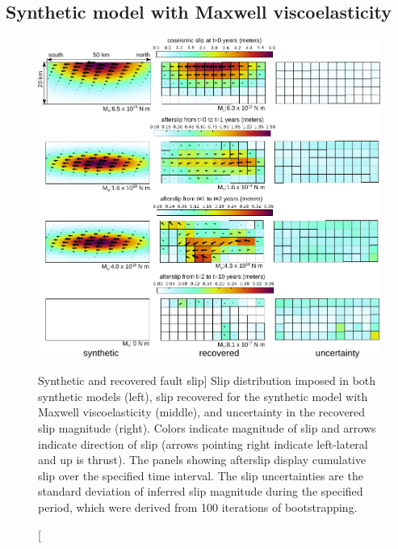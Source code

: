 \subsection{Synthetic model with Maxwell viscoelasticity}\label{ch2:sec:MaxModel}

\begin{figure}
\includegraphics{ch2/figures/Fig3.pdf}
\caption
[Synthetic and recovered fault slip]
{Slip distribution imposed in both synthetic models (left),
slip recovered for the synthetic model with Maxwell viscoelasticity
(middle), and uncertainty in the recovered slip magnitude (right).
Colors indicate magnitude of slip and arrows indicate direction of
slip (arrows pointing right indicate left-lateral and up is thrust).
The panels showing afterslip display cumulative slip over the
specified time interval.  The slip uncertainties are the standard
deviation of inferred slip magnitude during the specified period,
which were derived from 100 iterations of bootstrapping.}
\label{ch2:fig:3}
\end{figure}

